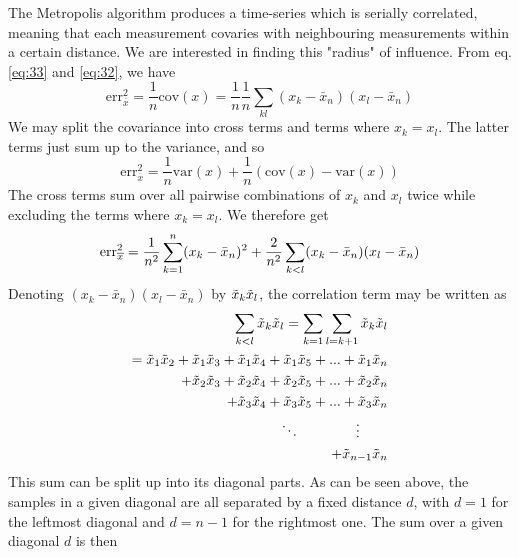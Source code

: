 \documentclass[
    a4paper, aps, twocolumn, floatfix, superscriptaddress,
    nofootinbib]{revtex4-1}
\begin{document}
The Metropolis algorithm produces a time-series which is serially correlated, meaning that each measurement covaries with neighbouring measurements within a certain distance. We are interested in finding this "radius" of influence. From eq. \eqref{eq:33} and \eqref{eq:32}, we have
\begin{equation}
    \text{err}_{\overline{x}}^2 = \frac{1}{n} \text{cov}(x) = \frac{1}{n}\frac{1}{n}\sum_{kl}(x_k - \bar{x}_n) (x_l - \bar{x}_n)
\end{equation}
We may split the covariance into cross terms and terms where $x_k = x_l$. The latter terms just sum up to the variance, and so 
\begin{equation}
    \text{err}_{\overline{x}}^2 = \frac{1}{n} \text{var}(x) + \frac{1}{n}(\text{cov}(x)-\text{var}(x))
\end{equation}
The cross terms sum over all pairwise combinations of $x_k$ and $x_l$ twice while excluding the terms where $x_k = x_l$. We therefore get 
\begin{equation}\label{eq:36}
    \text{err}_{\overline{x}}^2=\frac{1}{n^2} \sum_{k=1}^n (x_k - \Bar{x}_n)^2 + \frac{2}{n^2}\sum_{k<l}(x_k - \Bar{x}_n)(x_l-\Bar{x}_n)
\end{equation}
Denoting $(x_k - \bar{x}_n)(x_l - \bar{x}_n)$ by $\Tilde{x}_k\Tilde{x}_l$, the correlation term may be written as 
\begin{align}\label{eq:34}
    \sum_{k<l}  \Tilde{x}_k\Tilde{x}_l=\sum_{k=1}\sum_{l=k+1} \Tilde{x}_k\Tilde{x}_l& \\
    = \Tilde{x}_1\Tilde{x}_2+\Tilde{x}_1\Tilde{x}_3+\Tilde{x}_1\Tilde{x}_4+\Tilde{x}_1\Tilde{x}_5+...+\Tilde{x}_1\Tilde{x}_n& \nonumber \\
    + \Tilde{x}_2\Tilde{x}_3+\Tilde{x}_2\Tilde{x}_4+\Tilde{x}_2\Tilde{x}_5+...+\Tilde{x}_2\Tilde{x}_n& \nonumber \\
     + \Tilde{x}_{3}\Tilde{x}_{4}+\Tilde{x}_3\Tilde{x}_5 +...+ \Tilde{x}_{3}\Tilde{x}_{n}& \nonumber \\
     \ddots \qquad \qquad \vdots \qquad& \nonumber \\
    +\Tilde{x}_{n-1}\Tilde{x}_n \nonumber
\end{align}
This sum can be split up into its diagonal parts. As can be seen above, the samples in a given diagonal are all separated by a fixed distance $d$, with $d=1$ for the leftmost diagonal and $d=n-1$ for the rightmost one. The sum over a given diagonal $d$ is then 
\end{document}
